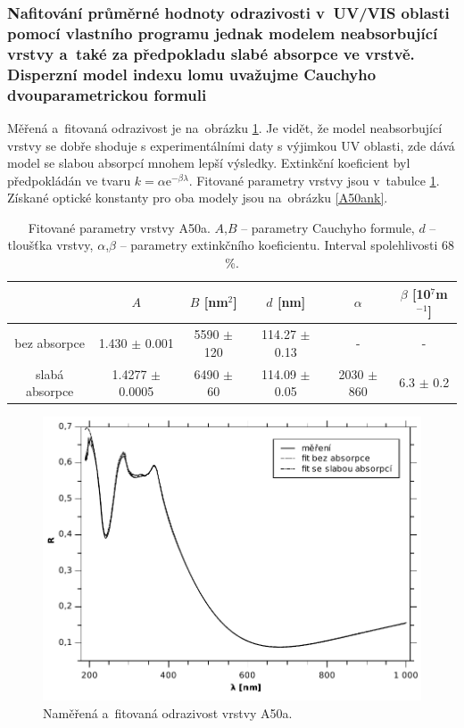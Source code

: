\documentclass[12pt]{article}
\begin{document}
\subsubsection{Nafitování průměrné hodnoty odrazivosti v~UV/VIS oblasti pomocí vlastního programu jednak modelem neabsorbující vrstvy a~také za předpokladu slabé absorpce ve vrstvě. Disperzní model indexu lomu uvažujme Cauchyho dvouparametrickou formuli }

Měřená a~fitovaná odrazivost je na~obrázku \ref{A50a-R}. Je vidět, že model neabsorbující vrstvy se dobře shoduje s experimentálními daty s výjimkou UV oblasti, zde dává model se slabou absorpcí mnohem lepší výsledky. Extinkční koeficient byl předpokládán ve tvaru $k = \alpha \mathrm{e}^{-\beta \lambda}$. Fitované parametry vrstvy jsou v~tabulce \ref{Afit}. Získané optické konstanty pro oba modely jsou na~obrázku \ref{A50ank}.


\begin{table}[htbp]
\begin{center}
\begin{tabular}{|c|c|c|c|c|c|}
\hline
 & $A$ & $B$ [nm$^2$] &  $d$ [nm] & $\alpha$ & $\beta$ [10$^7$m$^{-1}$] \\ \hline
bez absorpce & 1.430 $\pm$ 0.001 & 5590 $\pm$ 120 & 114.27 $\pm$ 0.13 & - & - \\ \hline
slabá absorpce & 1.4277 $\pm$ 0.0005 & 6490 $\pm$ 60 & 114.09 $\pm$ 0.05 & 2030 $\pm$ 860 & 6.3 $\pm$ 0.2\\ \hline

\end{tabular}
\caption{Fitované parametry vrstvy A50a. $A$,$B$ -- parametry Cauchyho formule, $d$ -- tloušťka vrstvy, $\alpha$,$\beta$ -- parametry extinkčního koeficientu. Interval spolehlivosti 68\,\%.}
\label{Afit}
\end{center}
\end{table}

\begin{figure}
  \centering
  \includegraphics[width=135mm]{img/A50a-R.pdf}
  \caption{Naměřená a~fitovaná odrazivost vrstvy A50a.}
  \label{A50a-R}
\end{figure}
\end{document}
